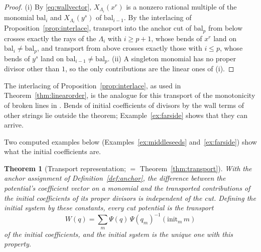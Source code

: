 \documentclass[11pt]{amsart}
\newtheorem{theorem}{Theorem}[section]
\theoremstyle{definition}
\theoremstyle{remark}
\begin{document}
\begin{proof}
(i) By \eqref{eq:wallvector}, $X_{\Lambda_{i}}(x^{r})$ is a nonzero rational
multiple of the monomial $\mathrm{bal}_{i}$ and $X_{\Lambda_{i}}(y^{s})$ of
$\mathrm{bal}_{i-1}$.  By the interlacing of
Proposition~\ref{prop:interlace}, transport into the anchor cut of
$\mathrm{bal}_{p}$ from below crosses exactly the rays of the $\Lambda_{i}$
with $i\ge p+1$, whose bends of $x^{r}$ land on $\mathrm{bal}_{i}\ne
\mathrm{bal}_p$, and transport from above crosses exactly those with $i\le p$,
whose bends of $y^{s}$ land on $\mathrm{bal}_{i-1}\ne\mathrm{bal}_p$.  (ii) A
singleton monomial has no proper divisor other than $1$, so the only
contributions are the linear ones of (i).
\end{proof}

The interlacing of Proposition~\ref{prop:interlace}, as used in
Theorem~\ref{thm:linearorder}, is the analogue for
this transport of the monotonicity of broken lines in \cite{CPS}.  Bends of
initial coefficients of divisors by the wall terms of other strings lie outside
the theorem; Example~\ref{ex:farside} shows that they can arrive.

Two computed examples below (Examples~\ref{ex:middleseeds}
and~\ref{ex:farside}) show what the initial coefficients are.

\begin{theorem}[Transport representation; $=$ Theorem~\ref{thm:transport}]
\label{thm:transport7}
With the anchor assignment of Definition~\ref{def:anchor}, the difference between
the potential's coefficient vector on a monomial and the transported contributions
of the initial coefficients of its proper divisors is independent of the cut.
Defining the \emph{initial system} by these constants, every cut potential is
the transport
\[
W(q)=\sum_{m}\Psi(q)\,\Psi(q_m)^{-1}(\mathrm{init}_{m}\,m)
\]
of the initial coefficients, and the initial system is the unique one with
this property.
\end{theorem}
\end{document}

